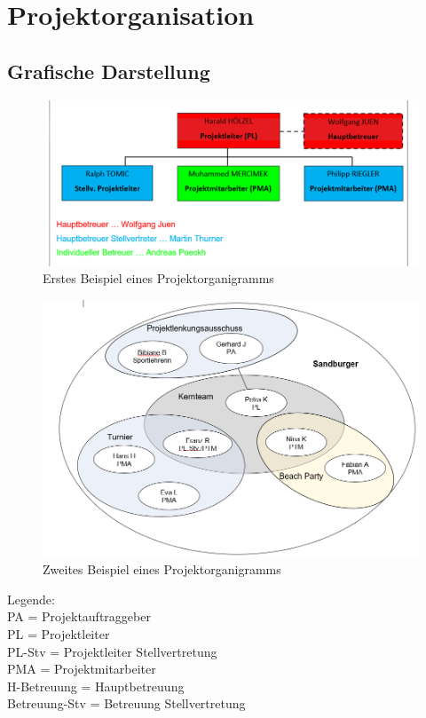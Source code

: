 \documentclass[
	headings=optiontotocandhead,%
	oneside,
	numbers=noenddot,%
	toc=flat, %
	10pt, %
	parskip=full, %
	listof=totoc, %
	listof=flat, %
	numbers=noenddot, %
	bibliography=totoc, %
	a4paper,DIV=14,
]{scrartcl}
\begin{document}
\newpage
\section{Projektorganisation}
\subsection{Grafische Darstellung}

\begin{figure}[h]
	\centering
	\includegraphics[width=1\linewidth]{Organigramm_1}
	\caption[]{Erstes Beispiel eines Projektorganigramms}
\end{figure}
\FloatBarrier 

\begin{figure}[h]
	\centering
	\includegraphics[width=1\linewidth]{Organigramm_2}
	\caption[]{Zweites Beispiel eines Projektorganigramms}
\end{figure}
\FloatBarrier 

{\small\begin{spacing}{1.125}
Legende: \\
PA = Projektauftraggeber \\
PL = Projektleiter \\
PL-Stv = Projektleiter Stellvertretung \\
PMA = Projektmitarbeiter \\
H-Betreuung = Hauptbetreuung \\
Betreuung-Stv = Betreuung Stellvertretung \\
\end{spacing}}
\end{document}
